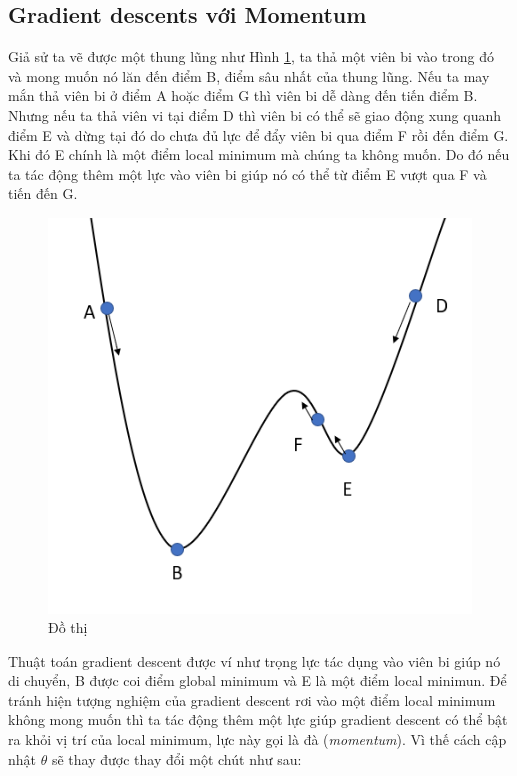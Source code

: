 \subsection{Gradient descents với Momentum}
  Giả sử ta vẽ được một thung lũng như Hình \ref{fig:dothi1}, ta thả một viên bi vào trong đó và mong muốn nó lăn đến điểm B, điểm sâu nhất của thung lũng. Nếu ta may mắn thả viên bi ở điểm A hoặc điểm G thì viên bi dễ dàng đến tiến điểm B. Nhưng nếu ta thả viên vi tại điểm D thì viên bi có thể sẽ giao động xung quanh điểm E và dừng tại đó do chưa đủ lực để đẩy viên bi qua điểm F rồi đến điểm G. Khi đó E chính là một điểm local minimum mà chúng ta không muốn. Do đó nếu ta tác động thêm một lực vào viên bi giúp nó có thể từ điểm E vượt qua F và tiến đến G. 
\begin{figure}[H]
\begin{center}
\includegraphics[scale=1]{chap3/image/momentum.png}
\end{center}
\caption{Đồ thị }
\label{fig:dothi1}
\end{figure}
Thuật toán gradient descent được ví như trọng lực tác dụng vào viên bi giúp nó di chuyển, B được coi điểm global minimum và E là một điểm local minimun. Để tránh hiện tượng nghiệm của gradient descent rơi vào một điểm local minimum không mong muốn thì ta tác động thêm một lực giúp gradient descent có thể bật ra khỏi vị trí của local minimum, lực này gọi là đà (\textit{momentum}). Vì thế cách cập nhật $\theta$ sẽ thay được thay đổi một chút như sau:
